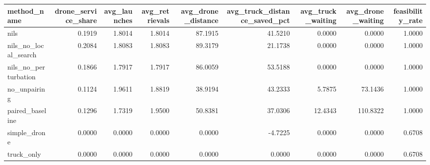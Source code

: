 \begin{tabular}{lrrrrrrrr}
\toprule
method_name & drone_service_share & avg_launches & avg_retrievals & avg_drone_distance & avg_truck_distance_saved_pct & avg_truck_waiting & avg_drone_waiting & feasibility_rate \\
\midrule
nils & 0.1919 & 1.8014 & 1.8014 & 87.1915 & 41.5210 & 0.0000 & 0.0000 & 1.0000 \\
nils_no_local_search & 0.2084 & 1.8083 & 1.8083 & 89.3179 & 21.1738 & 0.0000 & 0.0000 & 1.0000 \\
nils_no_perturbation & 0.1866 & 1.7917 & 1.7917 & 86.0059 & 53.5188 & 0.0000 & 0.0000 & 1.0000 \\
no_unpairing & 0.1124 & 1.9611 & 1.8819 & 38.9194 & 43.2333 & 5.7875 & 73.1436 & 1.0000 \\
paired_baseline & 0.1296 & 1.7319 & 1.9500 & 50.8381 & 37.0306 & 12.4343 & 110.8322 & 1.0000 \\
simple_drone & 0.0000 & 0.0000 & 0.0000 & 0.0000 & -4.7225 & 0.0000 & 0.0000 & 0.6708 \\
truck_only & 0.0000 & 0.0000 & 0.0000 & 0.0000 & 0.0000 & 0.0000 & 0.0000 & 0.6708 \\
\bottomrule
\end{tabular}
